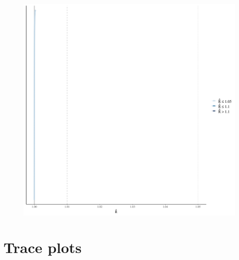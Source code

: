 \documentclass[
]{report}
\begin{document}
\begin{figure}

{\centering \includegraphics[width=1\textwidth,height=\textheight]{diagnostic_plots_files/figure-pdf/unnamed-chunk-4-1.pdf}

}

\end{figure}

\hypertarget{trace-plots-1}{%
\section{Trace plots}\label{trace-plots-1}}
\end{document}
